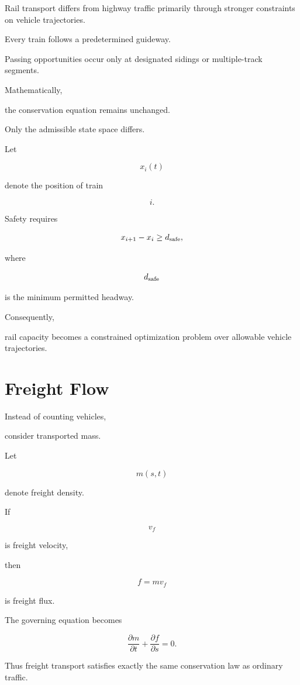 \documentclass[11pt,fleqn]{book}
\numberwithin{equation}{chapter}
\theoremstyle{plain}
\theoremstyle{definition}
\theoremstyle{remark}
\begin{document}
Rail transport differs from highway traffic primarily through stronger
constraints on vehicle trajectories.

Every train follows a predetermined guideway.

Passing opportunities occur only at designated sidings or multiple-track
segments.

Mathematically,

the conservation equation remains unchanged.

Only the admissible state space differs.

Let

\[
x_i(t)
\]

denote the position of train

\[
i.
\]

Safety requires

\[
x_{i+1}-x_i
\ge
d_{\rm safe},
\]

where

\[
d_{\rm safe}
\]

is the minimum permitted headway.

Consequently,

rail capacity becomes a constrained optimization problem over allowable
vehicle trajectories.


\section{Freight Flow}

Instead of counting vehicles,

consider transported mass.

Let

\[
m(s,t)
\]

denote freight density.

If

\[
v_f
\]

is freight velocity,

then

\[
f
=
mv_f
\]

is freight flux.

The governing equation becomes

\[
\boxed{
\frac{\partial m}{\partial t}
+
\frac{\partial f}{\partial s}
=
0.
}
\]

Thus freight transport satisfies exactly the same conservation law as
ordinary traffic.

\end{document}
